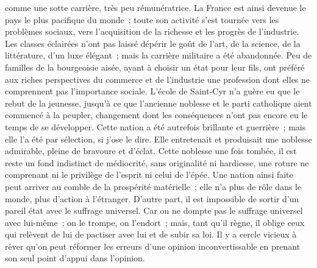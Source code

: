 \documentclass[french,twoside]{book} %
\begin{document}
comme une sotte carrière, très peu rémunératrice. La France est ainsi devenue le pays le plus pacifique du monde ; toute son activité s’est tournée vers les problèmes sociaux, vers l’acquisition de la richesse et les progrès de l’industrie. Les classes éclairées n’ont pas laissé dépérir le goût de l’art, de la science, de la littérature, d’un luxe élégant ; mais la carrière militaire a été abandonnée. Peu de familles de la bourgeoisie aisée, ayant à choisir un état pour leur fils, ont préféré aux riches perspectives du commerce et de l’industrie une profession dont elles ne comprennent pas l’importance sociale. L’école de Saint-Cyr n’a guère eu que le rebut de la jeunesse, jusqu’à ce que l’ancienne noblesse et le parti catholique aient commencé à la peupler, changement dont les conséquences n’ont pas encore eu le temps de se développer. Cette nation a été autrefois brillante et guerrière ; mais elle l’a été par sélection, si j’ose le dire. Elle entretenait et produisait une noblesse admirable, pleine de bravoure et d’éclat. Cette noblesse une fois tombée, il est reste un fond indistinct de médiocrité, sans originalité ni hardiesse, une roture ne comprenant ni le privilège de l’esprit ni celui de l’épée. Une nation ainsi faite peut arriver au comble de la prospérité matérielle ; elle n’a plus de rôle dans le monde, plus d’action à l’étranger. D’autre part, il est impossible de sortir d’un pareil état avec le suffrage universel. Car on ne dompte pas le suffrage universel avec lui-même ; on le trompe, on l’endort ; mais, tant qu’il règne, il oblige ceux qui relèvent de lui de pactiser avec lui et de subir sa loi. Il y a cercle vicieux à rêver qu’on peut réformer les erreurs d’une opinion inconvertissable en prenant son seul point d’appui dans l’opinion.\par
\end{document}
